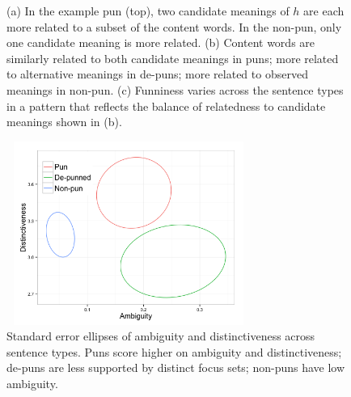 \documentclass[10pt,letterpaper]{article}
\begin{document}
\begin{figure}[t]
{\begin{subfigure}{0.31\textwidth}
\end{subfigure}
}
\caption{(a) In the example pun (top), two candidate meanings of $h$ are each more related to a subset of the content words. In the non-pun, only one candidate meaning is more related. (b) Content words are similarly related to both candidate meanings in puns; more related to alternative meanings in de-puns; more related to observed meanings in non-pun. (c) Funniness varies across the sentence types in a pattern that reflects the balance of relatedness to candidate meanings shown in (b).}
\label{ratings_analyses}
\end{figure}

\begin{figure}[t]
\includegraphics[width=80mm, height=60mm] {Plots/ellipse_camera.png}
\caption{Standard error ellipses of ambiguity and distinctiveness across sentence types. Puns score higher on ambiguity and distinctiveness; de-puns are less supported by distinct focus sets; non-puns have low ambiguity.}
\label{ellipse}
\end{figure}
\end{document}
